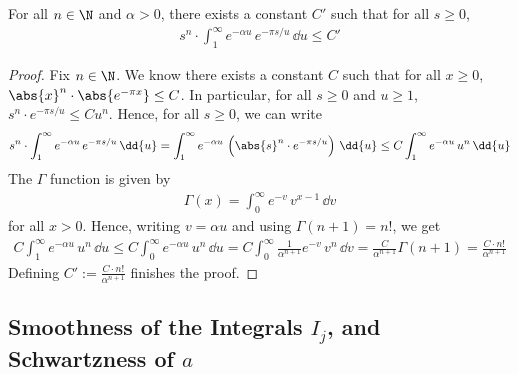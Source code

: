\begin{lemma}\label{lem:integral-bound}
    For all $n \in \N$ and $\alpha > 0$, there exists a constant $C'$ such that for all $s \geq 0$,
    \begin{align}
        s^n \cdot \int_{1}^{\infty} e^{-\alpha u} \, e^{-\pi s /u} \, \dd u \leq C'
    \end{align}
\end{lemma}
\begin{proof}
    Fix $n \in \N$. We know there exists a constant $C$ such that for all $x \geq 0$, $\abs{x}^n \cdot \abs{e^{-\pi x}} \leq C$. In particular, for all $s \geq 0$ and $u \geq 1$, $s^n \cdot e^{-\pi s/u} \leq C u^n$. Hence, for all $s \geq 0$, we can write
    \begin{align}
        s^n \cdot \int_{1}^{\infty} e^{-\alpha u} \, e^{-\pi s /u} \, \dd{u}
        = \int_{1}^{\infty} e^{-\alpha u} \, \left(\abs{s}^n \cdot e^{-\pi s /u}\right) \, \dd{u}
        \leq C \int_{1}^{\infty} e^{-\alpha u} \, u^n \, \dd{u}
    \end{align}
    The $\Gamma$ function is given by
    \begin{align}
        \Gamma(x) = \int_{0}^{\infty} e^{-v} \, v^{x-1} \, \dd{v}
    \end{align}
    for all $x > 0$. Hence, writing $v = \alpha u$ and using $\Gamma(n+1) = n!$, we get
    \begin{align}
        C \int_{1}^{\infty} e^{-\alpha u} \, u^n \, \dd{u}
        \leq C \int_{0}^{\infty} e^{-\alpha u} \, u^n \, \dd{u}
        = C \int_{0}^{\infty} \frac{1}{\alpha^{n+1}} e^{-v} \, v^n \, \dd{v}
        = \frac{C}{\alpha^{n+1}} \Gamma(n+1)
        = \frac{C \cdot n!}{\alpha^{n+1}}
    \end{align}
    Defining $C' := \frac{C \cdot n!}{\alpha^{n+1}}$ finishes the proof.
\end{proof}

\subsection{Smoothness of the Integrals $I_j$, and Schwartzness of $a$}


